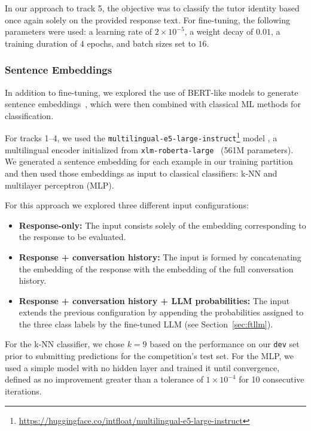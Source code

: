\documentclass[11pt]{article}
\begin{document}
In our approach to track 5, the objective was to classify the tutor identity based once again solely on the provided response text. For fine-tuning, the following parameters were used: a learning rate of $2 \times 10^{-5}$, a weight decay of $0.01$, a training duration of $4$ epochs, and batch sizes set to $16$.


\subsubsection{Sentence Embeddings}

In addition to fine-tuning, we explored the use of BERT-like models to generate sentence embeddings~\cite{reimers-gurevych-2019-sentence}, which were then combined with classical ML methods for classification.

For tracks 1--4, we used the \texttt{multilingual-e5-large-instruct}\footnote{\url{https://huggingface.co/intfloat/multilingual-e5-large-instruct}} model \cite{wang2024multilingual}, a multilingual encoder initialized from \texttt{xlm-roberta-large}~\cite{conneau2019xlmroberta} (561M parameters).
We generated a sentence embedding for each example in our training partition and then used those embeddings as input to classical classifiers: k-NN and multilayer perceptron (MLP).

For this approach we explored three different input configurations:
\begin{itemize}
    \setlength\itemsep{0em}
    \item\textbf{Response-only:} The input consists solely of the embedding corresponding to the response to be evaluated.
    \item\textbf{Response + conversation history:} The input is formed by concatenating the embedding of the response with the embedding of the full conversation history.
    \item\textbf{Response + conversation history + LLM probabilities:} The input extends the previous configuration by appending the probabilities assigned to the three class labels by the fine-tuned LLM (see Section~\ref{sec:ftllm}).
\end{itemize}

For the k-NN classifier, we chose $k=9$ based on the performance on our \texttt{dev} set prior to submitting predictions for the competition's test set.
For the MLP, we used a simple model with no hidden layer and trained it until convergence, defined as no improvement greater than a tolerance of $1 \times 10^{-4}$ for 10 consecutive iterations.
\end{document}
